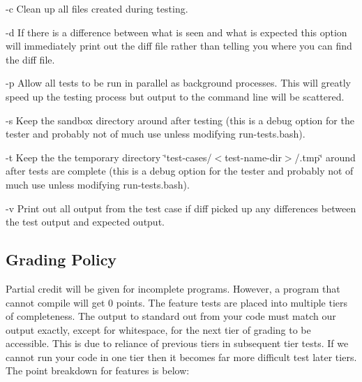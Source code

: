 \begin{DoxyItemize}
\item -\/c Clean up all files created during testing.
\item -\/d If there is a difference between what is seen and what is expected this option will immediately print out the diff file rather than telling you where you can find the diff file.
\item -\/p Allow all tests to be run in parallel as background processes. This will greatly speed up the testing process but output to the command line will be scattered.
\item -\/s Keep the sandbox directory around after testing (this is a debug option for the tester and probably not of much use unless modifying run-\/tests.\+bash).
\item -\/t Keep the the temporary directory \char`\"{}test-\/cases/$<$test-\/name-\/dir$>$/.\+tmp\char`\"{} around after tests are complete (this is a debug option for the tester and probably not of much use unless modifying run-\/tests.\+bash).
\item -\/v Print out all output from the test case if diff picked up any differences between the test output and expected output.
\end{DoxyItemize}

\subsection*{Grading Policy}

Partial credit will be given for incomplete programs. However, a program that cannot compile will get 0 points. The feature tests are placed into multiple tiers of completeness. The output to standard out from your code must match our output exactly, except for whitespace, for the next tier of grading to be accessible. This is due to reliance of previous tiers in subsequent tier tests. If we cannot run your code in one tier then it becomes far more difficult test later tiers. The point breakdown for features is below\+:

